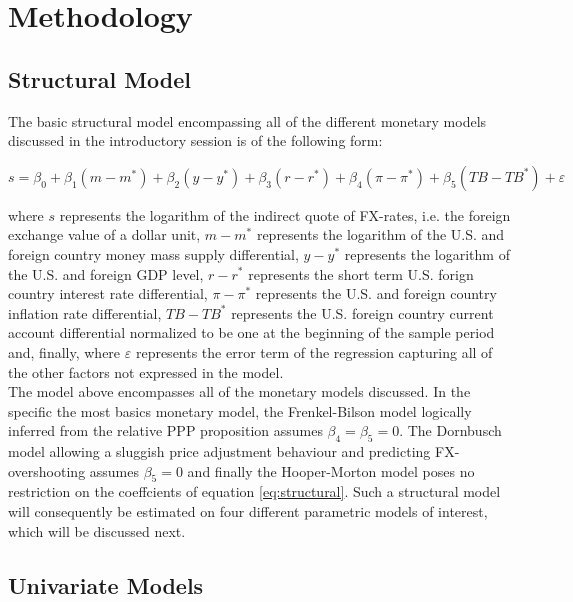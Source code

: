\section{Methodology}
\label{sec:part2}

\subsection{Structural Model}

The basic structural model encompassing all of the different monetary models
discussed in the introductory session is of the following form:

\begin{equation} \label{eq:structural}
  s = \beta_{0} + \beta_{1}(m - m^{*}) + \beta_{2}(y-y^{*}) + \beta_{3}(r-r^{*})
  + \beta_{4}(\pi - \pi^{*}) + \beta_{5}(TB - TB^{*}) + \varepsilon
\end{equation}

where $s$ represents the logarithm of the indirect quote of FX-rates, i.e. the
foreign exchange value of a dollar unit, $m-m^{*}$ represents the logarithm of
the U.S. and foreign country money mass supply differential, $y-y^{*}$ represents the logarithm
of the U.S. and foreign GDP level, $r-r^{*}$ represents the short term U.S. forign country
interest rate differential, $\pi - \pi^{*}$ represents the U.S. and foreign country inflation
rate differential, $TB - TB^{*}$ represents the U.S. foreign country current account differential
normalized to be one at the beginning of the sample period and, finally, where
$\varepsilon$ represents the error term of the regression capturing all of the
other factors not expressed in the model.\\
The model above encompasses all of the monetary models discussed. In the specific
the most basics monetary model, the Frenkel-Bilson model logically inferred from
the relative PPP proposition assumes $\beta_{4} = \beta_{5} = 0$. The Dornbusch model allowing
a sluggish price adjustment behaviour and predicting FX-overshooting
assumes $\beta_{5} = 0$ and finally the Hooper-Morton model poses no restriction on
the coeffcients of equation \ref{eq:structural}. Such a structural model will consequently
be estimated on four different parametric models of interest, which will be discussed next.

\subsection{Univariate Models}
\label{sub:univariate}

